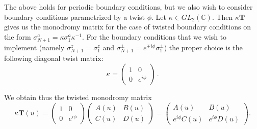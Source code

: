 \documentclass[a4paper,10pt]{article}
\newcommand{\q}{\mathfrak{q}}
\begin{document}
%
%
The above holds for periodic boundary conditions, but we also wish to consider boundary conditions parametrized by a twist $\phi$.  Let $\kappa \in GL_2(\mathbb{C})$. Then $\kappa \mathbf{T}$ gives us the monodromy matrix for the case of twisted boundary conditions on the form $\sigma^a_{N+1}=\kappa\sigma^a_1\kappa^{-1}$. For the boundary conditions that we wish to implement (namely $\sigma^z_{N+1}=\sigma^z_1$ and $\sigma^{\pm}_{N+1}=e^{\mp i \phi} \sigma^{\pm}_1$) the proper choice is the following diagonal twist matrix:
%
\begin{equation}
\kappa=\begin{pmatrix}
1&0\\
0&e^{i\phi }
\end{pmatrix} \,.
\end{equation}

We obtain thus the twisted monodromy matrix
\begin{equation}\label{twistedT}
\kappa\mathbf{T}(u)=
\begin{pmatrix}
1&0\\
0&e^{i\phi }
\end{pmatrix}
\begin{pmatrix}
A(u)&B(u)\\
C(u)&D(u)
\end{pmatrix} =
\begin{pmatrix}
A(u)&B(u)\\
e^{i\phi }C(u)&e^{i\phi }D(u)
\end{pmatrix}.
\end{equation}
\end{document}
